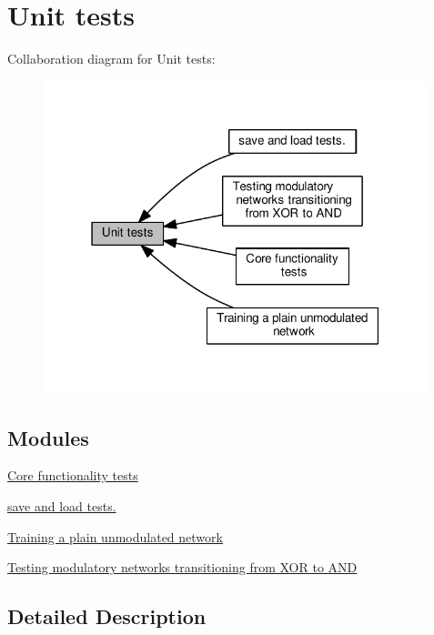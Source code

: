 \hypertarget{group__tests}{}\section{Unit tests}
\label{group__tests}
Collaboration diagram for Unit tests\+:
\nopagebreak
\begin{figure}[H]
\begin{center}
\leavevmode
\includegraphics[width=316pt]{group__tests}
\end{center}
\end{figure}
\subsection*{Modules}
\begin{DoxyCompactItemize}
\item 
\hyperlink{group__basictests}{Core functionality tests}
\item 
\hyperlink{group__saveloadtests}{save and load tests.}
\item 
\hyperlink{group__testtrainbasic}{Training a plain unmodulated network}
\item 
\hyperlink{group__booleantests}{Testing modulatory networks transitioning from X\+O\+R to A\+ND}
\end{DoxyCompactItemize}


\subsection{Detailed Description}
